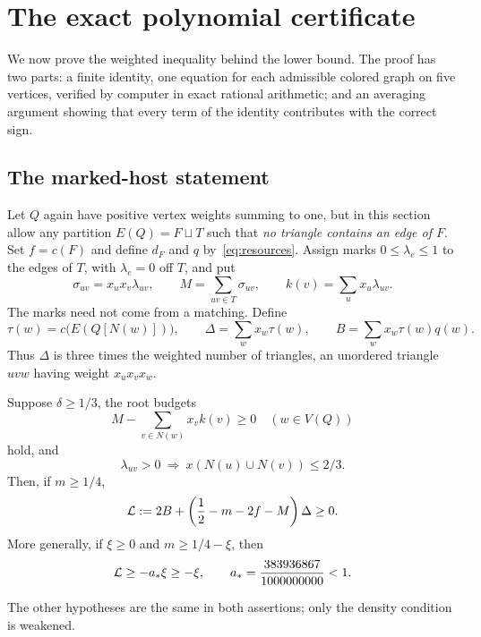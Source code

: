 \section{The exact polynomial certificate}\label{sec:certificate}
We now prove the weighted inequality behind the lower bound. The proof has two parts: a finite identity, one equation for each admissible colored graph on five vertices, verified by computer in exact rational arithmetic; and an averaging argument showing that every term of the identity contributes with the correct sign.

\subsection{The marked-host statement}
Let $Q$ again have positive vertex weights summing to one, but in this section allow any partition $E(Q)=F\sqcup T$ such that \emph{no triangle contains an edge of $F$}. Set $f=c(F)$ and define $d_F$ and $q$ by~\eqref{eq:resources}. Assign marks $0\le\lambda_e\le1$ to the edges of $T$, with $\lambda_e=0$ off $T$, and put
\[
 \sigma_{uv}=x_ux_v\lambda_{uv},\qquad
 M=\sum_{uv\in T}\sigma_{uv},\qquad
 k(v)=\sum_u x_u\lambda_{uv}.
\]
The marks need not come from a matching. Define
\begin{equation}\label{eq:triangleobservables}
 \tau(w)=c\bigl(E(Q[N(w)])\bigr),\qquad
 \Delta=\sum_wx_w\tau(w),\qquad
 B=\sum_wx_w\tau(w)q(w).
\end{equation}
Thus $\Delta$ is three times the weighted number of triangles, an unordered triangle $uvw$ having weight $x_ux_vx_w$.

\begin{theorem}\label{thm:polynomial}
Suppose $\delta\ge1/3$, the root budgets
\[
 M-\sum_{v\in N(w)}x_vk(v)\ge0\quad(w\in V(Q))
\]
hold, and
\[
 \lambda_{uv}>0\ \Longrightarrow\
 x(N(u)\cup N(v))\le2/3.
\]
Then, if $m\ge1/4$,
\begin{equation}\label{eq:polynomial}
 \mathcal L:=2B+\left(\frac12-m-2f-M\right)\Delta\ge0.
\end{equation}
More generally, if $\xi\ge0$ and $m\ge1/4-\xi$, then
\begin{equation}\label{eq:polynomialstable}
 \mathcal L\ge-a_*\xi\ge-\xi,
 \qquad a_*=\frac{383936867}{1000000000}<1.
\end{equation}
\end{theorem}
The other hypotheses are the same in both assertions; only the density condition is weakened.

